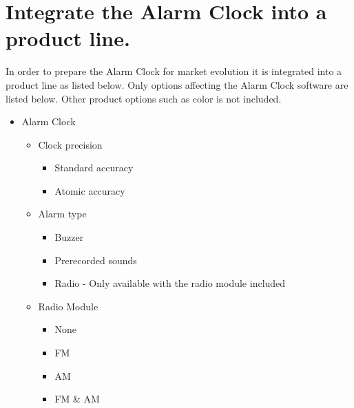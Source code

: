 \documentclass[Main_Assignment3]{subfiles}
\begin{document}
\section{Integrate the Alarm Clock into a product line.}

In order to prepare the Alarm Clock for market evolution it is integrated into a product line as listed below.
Only options affecting the Alarm Clock software are listed below. Other product options such as color is not included.
\begin{itemize}
	\item Alarm Clock
	\begin{itemize}
		\item Clock precision
		\begin{itemize}
			\item Standard accuracy
			\item Atomic accuracy
		\end{itemize}
		\item Alarm type
		\begin{itemize}
			\item Buzzer
			\item Prerecorded sounds
			\item Radio - Only available with the radio module included
		\end{itemize}
		\item Radio Module
		\begin{itemize}
			\item None
			\item FM
			\item AM
			\item FM & AM
		\end{itemize}
	\end{itemize}
\end{itemize}
\end{document}
